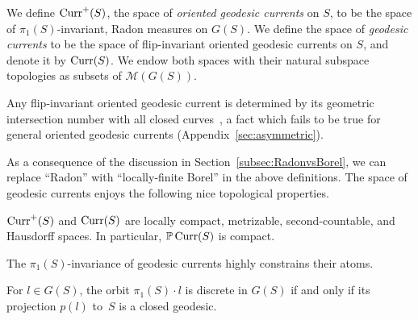\begin{definition}\label{def:currents}
We define $\operatorname{Curr}^+(S)$, the space of \emph{oriented geodesic currents} on $S$,
to be the
space of $\pi_1(S)$-invariant, Radon measures on
$G(S)$.
We define the space of 
\emph{geodesic currents} to be the space of flip-invariant oriented
geodesic currents on $S$, and denote it by $\operatorname{Curr}(S)$. We endow both
spaces with their natural subspace topologies as subsets of
$\mathcal{M}(G(S))$.
\end{definition}

Any flip-invariant oriented geodesic current is determined by its
geometric intersection number with all closed
curves~\cite[Th\'eor\`eme~2]{Otal90:SpectreMarqueNegative}, a fact
which fails to be true for general oriented geodesic currents
(Appendix~\ref{sec:asymmetric}).

As a consequence of the discussion in
Section~\ref{subsec:RadonvsBorel}, we can replace ``Radon'' with
``locally-finite Borel'' in the above definitions.
The space of geodesic currents enjoys the following nice topological properties.

\begin{proposition}
$\operatorname{Curr}^+(S)$ and $\operatorname{Curr}(S)$  are locally compact, metrizable, second-countable, and Hausdorff spaces. In particular, $\mathbb{P}\operatorname{Curr}(S)$ is compact.
\label{prop:local_compactness}
\end{proposition}

The $\pi_1(S)$-invariance of geodesic currents highly constrains their atoms.
\begin{proposition}
  For $l \in G(S)$, the orbit $\pi_1(S)\cdot l$ is
  discrete in $G(S)$ if and only if its projection $p(l)$ to~$S$ is a closed
  geodesic.
\end{proposition}

